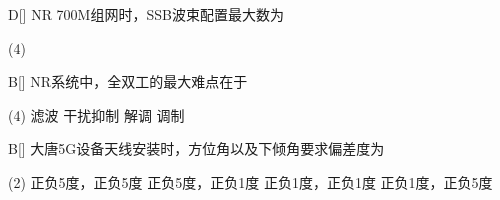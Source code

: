 

\begin{choice}{D}[]
    NR 700M组网时，SSB波束配置最大数为
    \begin{tasks}(4)
    \end{tasks}
\end{choice}

\begin{choice}{B}[]
    NR系统中，全双工的最大难点在于
    \begin{tasks}(4)
        \task 滤波
        \task 干扰抑制
        \task 解调
        \task 调制
    \end{tasks}
\end{choice}




\begin{choice}{B}[]
    大唐5G设备天线安装时，方位角以及下倾角要求偏差度为
    \begin{tasks}(2)
        \task 正负5度，正负5度
        \task 正负5度，正负1度
        \task 正负1度，正负1度
        \task 正负1度，正负5度
    \end{tasks}
\end{choice}


